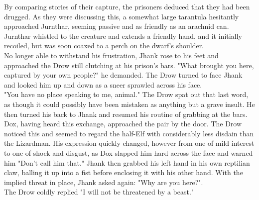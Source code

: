 \documentclass[letterpaper,10pt,twoside,twocolumn,openany]{book}
\begin{document}
By comparing stories of their capture, the prisoners deduced that they had been drugged. As they were discussing this, a somewhat large tarantula hesitantly approached Jurnthar, seeming passive and as friendly as an arachnid can. Jurnthar whistled to the creature and extends a friendly hand, and it initially recoiled, but was soon coaxed to a perch on the dwarf's shoulder.\\

No longer able to withstand his frustration, Jhank rose to his feet and approached the Drow still clutching at his prison's bars. "What brought you here, captured by your own people?" he demanded. The Drow turned to face Jhank and looked him up and down as a sneer sprawled across his face.\\


"You have no place speaking to me, animal." The Drow spat out that last word, as though it could possibly have been mistaken as anything but a grave insult. He then turned his back to Jhank and resumed his routine of grabbing at the bars.\\

Dox, having heard this exchange, approached the pair by the door. The Drow noticed this and seemed to regard the half-Elf with considerably less disdain than the Lizardman. His expression quickly changed, however from one of mild interest to one of shock and disgust, as Dox slapped him hard across the face and warned him "Don't call him that." Jhank then grabbed his left hand in his own reptilian claw, balling it up into a fist before enclosing it with his other hand. With the implied threat in place, Jhank asked again: "Why are you here?".\\

The Drow coldly replied "I will not be threatened by a beast."\\
\end{document}
